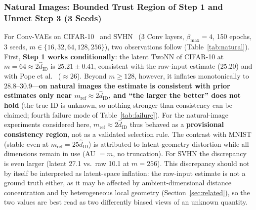 \documentclass[make,article,submit,pdftex,moreauthors]{Definitions/mdpi}
\newcommand{\hatdID}{\hat{d}_{\mathrm{ID}}}
\begin{document}
\subsubsection{Natural Images: Bounded Trust Region of Step 1 and Unmet Step 3 (3 Seeds)}

For Conv-VAEs on CIFAR-10~\cite{krizhevsky2009learning} and
SVHN~\cite{netzer2011reading} (3 Conv layers, $\beta_{\max} = 4$,
150 epochs, 3 seeds, $m \in \{16, 32, 64, 128, 256\}$), two observations
follow (Table~\ref{tab:natural}).
First, \textbf{Step 1 works conditionally}: the latent TwoNN of CIFAR-10 at
$m = 64 \approx 2\hatdID$ is $25.21 \pm 0.41$, consistent with the raw-input
estimate (25.20) and with Pope et al.~\cite{pope2021intrinsic}
($\approx 26$).
Beyond $m \geq 128$, however, it inflates monotonically to
$28.8$--$30.9$---\textbf{on natural images the estimate is consistent with
prior estimates only near $m_{\mathrm{ref}} \approx 2\hatdID$, and ``the
larger the better'' does not hold} (the true ID is unknown, so nothing
stronger than consistency can be claimed; fourth failure mode of
Table~\ref{tab:failure}).
For the natural-image experiments considered here,
$m_{\mathrm{ref}} \approx 2\hatdID$ thus behaved as a \textbf{provisional
consistency region}, not as a validated selection rule.
The contrast with MNIST (stable even at $m_{\mathrm{ref}} = 25\hatdID$) is
attributed to latent-geometry distortion while all dimensions remain in use
(AU $= m$, no truncation).
For SVHN the discrepancy is even larger (latent 27.1 vs.\ raw 10.1 at
$m = 256$).
This discrepancy should not by itself be interpreted as latent-space
inflation: the raw-input estimate is not a ground truth either, as it may
be affected by ambient-dimensional distance concentration and by
heterogeneous local geometry (Section~\ref{sec:related}), so the two
values are best read as two differently biased views of an unknown
quantity.
\end{document}
